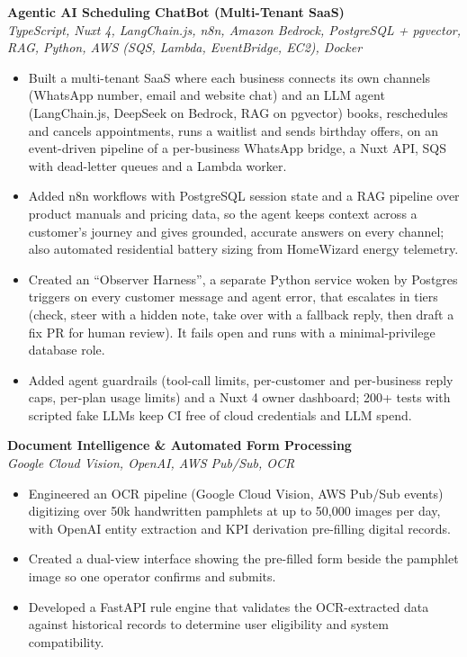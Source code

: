 \documentclass{res} %
\begin{document}
\begin{resume}
  \textbf{Agentic AI Scheduling ChatBot (Multi-Tenant SaaS)} \\
  {\sl TypeScript, Nuxt 4, LangChain.js, n8n, Amazon Bedrock, PostgreSQL + pgvector, RAG, Python, AWS (SQS, Lambda, EventBridge, EC2), Docker} \smallskip
  \begin{itemize}
    \item Built a multi-tenant SaaS where each business connects its own channels (WhatsApp number, email and website chat) and an LLM agent (LangChain.js, DeepSeek on Bedrock, RAG on pgvector) books, reschedules and cancels appointments, runs a waitlist and sends birthday offers, on an event-driven pipeline of a per-business WhatsApp bridge, a Nuxt API, SQS with dead-letter queues and a Lambda worker.
    \item Added n8n workflows with PostgreSQL session state and a RAG pipeline over product manuals and pricing data, so the agent keeps context across a customer's journey and gives grounded, accurate answers on every channel; also automated residential battery sizing from HomeWizard energy telemetry.
    \item Created an ``Observer Harness'', a separate Python service woken by Postgres triggers on every customer message and agent error, that escalates in tiers (check, steer with a hidden note, take over with a fallback reply, then draft a fix PR for human review). It fails open and runs with a minimal-privilege database role.
    \item Added agent guardrails (tool-call limits, per-customer and per-business reply caps, per-plan usage limits) and a Nuxt 4 owner dashboard; 200+ tests with scripted fake LLMs keep CI free of cloud credentials and LLM spend.
  \end{itemize}
  \vspace{6pt}

  \textbf{Document Intelligence \& Automated Form Processing} \\
  {\sl Google Cloud Vision, OpenAI, AWS Pub/Sub, OCR} \smallskip
  \begin{itemize}
    \item Engineered an OCR pipeline (Google Cloud Vision, AWS Pub/Sub events) digitizing over 50k handwritten pamphlets at up to 50,000 images per day, with OpenAI entity extraction and KPI derivation pre-filling digital records.
    \item Created a dual-view interface showing the pre-filled form beside the pamphlet image so one operator confirms and submits.
    \item Developed a FastAPI rule engine that validates the OCR-extracted data against historical records to determine user eligibility and system compatibility.
  \end{itemize}
  \vspace{6pt}


\end{resume}
\end{document}
